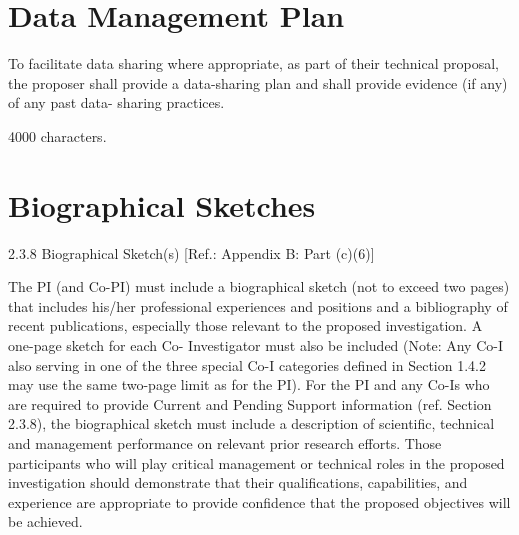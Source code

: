 \documentclass[12pt]{article}
\begin{document}

\cleardoublepage


\section*{Data Management Plan}
To facilitate data sharing where appropriate, as part of their
technical proposal, the proposer shall provide a data-sharing plan and
shall provide evidence (if any) of any past data- sharing practices.

4000 characters.



\cleardoublepage






\cleardoublepage

\section*{Biographical Sketches}
%
2.3.8 Biographical Sketch(s) [Ref.: Appendix B: Part (c)(6)]

The PI (and Co-PI) must include a biographical sketch (not to exceed
two pages) that includes his/her professional experiences and
positions and a bibliography of recent publications, especially those
relevant to the proposed investigation. A one-page sketch for each Co-
Investigator must also be included (Note: Any Co-I also serving in one
of the three special Co-I categories defined in Section 1.4.2 may use
the same two-page limit as for the PI). For the PI and any Co-Is who
are required to provide Current and Pending Support information
(ref. Section 2.3.8), the biographical sketch must include a
description of scientific, technical and management performance on
relevant prior research efforts. Those participants who will play
critical management or technical roles in the proposed investigation
should demonstrate that their qualifications, capabilities, and
experience are appropriate to provide confidence that the proposed
objectives will be achieved.
\end{document}
